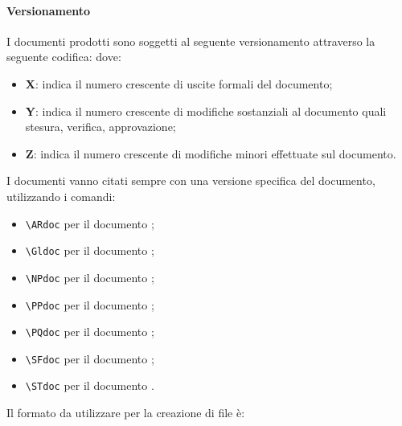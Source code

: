 	\paragraph{Versionamento}
	\label{sec:3.1.2.6}
		I documenti prodotti sono soggetti al seguente versionamento attraverso la seguente codifica:
		dove:
		\begin{itemize}
			\item \textbf{X}: indica il numero crescente di uscite formali del documento;
			\item \textbf{Y}: indica il numero crescente di modifiche sostanziali al documento quali stesura, verifica, approvazione;
			\item \textbf{Z}: indica il numero crescente di modifiche minori effettuate sul documento.
		\end{itemize}
		I documenti vanno citati sempre con una versione specifica del documento, utilizzando i comandi:
		\begin{itemize}
			\item \texttt{\textbackslash ARdoc} per il documento \ARdoc;
			\item \texttt{\textbackslash Gldoc} per il documento \Gldoc;
			\item \texttt{\textbackslash NPdoc} per il documento \NPdoc;
			\item \texttt{\textbackslash PPdoc} per il documento \PPdoc;
			\item \texttt{\textbackslash PQdoc} per il documento \PQdoc;
			\item \texttt{\textbackslash SFdoc} per il documento \SFdoc;
			\item \texttt{\textbackslash STdoc} per il documento \STdoc.
		\end{itemize}
		Il formato da utilizzare per la creazione di file è:

